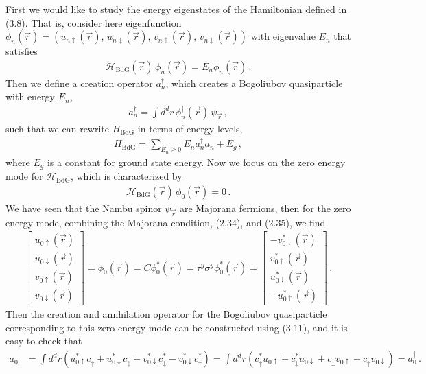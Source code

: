 \documentclass[11pt, oneside]{book}
\theoremstyle{break}
\theoremstyle{break}
\newcommand{\bmat}[1]{\begin{bmatrix} #1 \end{bmatrix}}
\begin{document}
First we would like to study the energy eigenstates of the Hamiltonian defined in (3.8). That is, consider here eigenfunction $\phi_n(\vec{r}) = (u_{n\uparrow}(\vec{r}),\, u_{n\downarrow}(\vec{r}) ,\, v_{n\uparrow}(\vec{r}),\, v_{n\downarrow}(\vec{r}))$ with eigenvalue $E_n$ that satisfies
\begin{align}
\mathcal{H}_{\text{BdG}}(\vec{r})\, \phi_n(\vec{r}) = E_n \phi_n(\vec{r})\,.
\end{align}
Then we define a creation operator $a_n^\dagger$, which creates a Bogoliubov quasiparticle with energy $E_n$,
\begin{align}
a^\dagger_n = \int d^d r \, \phi_n^\dagger(\vec{r})\, \psi_{\vec{r}}\,,
\end{align}
such that we can rewrite $H_{\text{BdG}}$ in terms of energy levels, 
\begin{align}
H_{\text{BdG}} = \sum_{E_n\geq 0} E_n a_n^\dagger a_n + E_g\,,
\end{align}
where $E_g$ is a constant for ground state energy. Now we focus on the zero energy mode for $\mathcal{H}_{\text{BdG}}$, which is characterized by
\begin{align}
\mathcal{H}_{\text{BdG}}(\vec{r})\, \phi_0(\vec{r}) = 0\,.
\end{align}
We have seen that the Nambu spinor $\psi_{\vec{r}}$ are Majorana fermions, then for the zero energy mode, combining the Majorana condition, (2.34), and (2.35), we find
\begin{align}
\bmat{u_{0\uparrow}(\vec{r})\\ 
u_{0\downarrow}(\vec{r}) \\ 
v_{0\uparrow}(\vec{r})   \\
v_{0\downarrow}(\vec{r})} = \phi_0(\vec{r}) = C\phi_0^*(\vec{r}) = 
\tau^y\sigma^y\phi_0^*(\vec{r}) =
\bmat{
-v^*_{0\downarrow}(\vec{r})  \\
v^*_{0\uparrow}(\vec{r})   \\
u_{0\downarrow}^*(\vec{r}) \\ 
-u_{0\uparrow}^*(\vec{r})
}\,.
\end{align}
Then the creation and annhilation operator for the Bogoliubov quasiparticle corresponding to this zero energy mode can be constructed using (3.11), and it is easy to check that 
\begin{align}
a_0&=\int d^d r \left(
u^*_{0\uparrow}c_{\uparrow} + 
u_{0\downarrow}^* c_{\downarrow} + 
v_{0\downarrow}^* c_{\downarrow}^* -v_{0\downarrow}^* c_{\uparrow}^*
\right)  
= \int d^d r \left(c_{\uparrow}^* u_{0\uparrow} + c_{\downarrow}^*u_{0\downarrow} + c_{\downarrow}v_{0\uparrow} - c_{\uparrow}v_{0\downarrow}\right)= a^\dagger_0\,.
\end{align}
\end{document}
